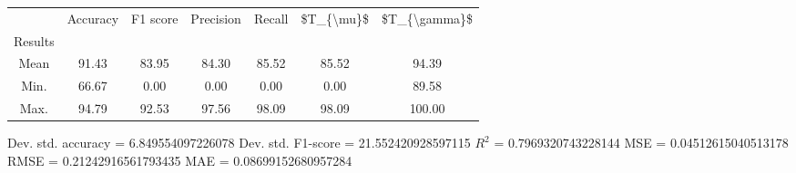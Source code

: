 \begin{tabular}{|c|c|c|c|c|c|c|}
\toprule
{} &  Accuracy &  F1 score &  Precision &  Recall &  \$T\_\{\textbackslash mu\}\$ &  \$T\_\{\textbackslash gamma\}\$ \\
Results &           &           &            &         &            &               \\
\hline
Mean    &     91.43 &     83.95 &      84.30 &   85.52 &      85.52 &         94.39 \\
Min.    &     66.67 &      0.00 &       0.00 &    0.00 &       0.00 &         89.58 \\
Max.    &     94.79 &     92.53 &      97.56 &   98.09 &      98.09 &        100.00 \\
\bottomrule
\end{tabular}

 Dev. std. accuracy = 6.849554097226078
 Dev. std. F1-score = 21.552420928597115
 $R^2$ = 0.7969320743228144
 MSE = 0.04512615040513178
 RMSE = 0.21242916561793435
 MAE = 0.08699152680957284